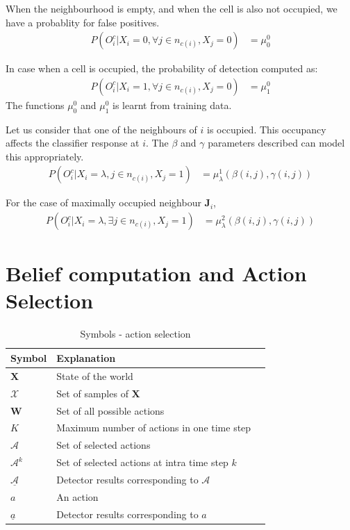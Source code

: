 \documentclass[10pt,twocolumn,letterpaper]{article}
\begin{document}
When the neighbourhood is empty, and when the cell is also not occupied, we have a probablity for false positives.
\begin{align}
 P(O^{c}_{i} |X_{i}=0 ,\forall j \in{n_{c(i)}},X_{j} =0)  &=\mu^{0}_{0}
\end{align}

In case when a cell is occupied, the probability of detection computed as:
\begin{align}
 P(O^{c}_{i} |X_{i}=1 ,\forall j \in{n_{c(i)}},X_{j} =0)  &=\mu^{0}_{1}
\end{align}
The functions $ \mu^{0}_{0} $  and $ \mu^{0}_{1} $ is learnt from training data.

Let us consider that one of the neighbours of $ i$ is occupied. This occupancy affects the classifier response at $ i$. The $\beta$ and $\gamma$ parameters described can model this appropriately.
 \begin{align}
 P(O^{c}_{i} |X_{i}=\lambda , j \in{n_{c(i)}},X_{j} =1)  &=\mu^{1}_{\lambda}(\beta(i,j),\gamma(i,j))
\end{align}


For the case of maximally occupied neighbour $ \textbf{J}_{i} $, 
\begin{align}
 P(O^{c}_{i} |X_{i}=\lambda ,\exists j  \in{n_{c(i)}},X_{j} =1)  &=\mu^{2}_{\lambda}(\beta(i,j),\gamma(i,j))
\end{align}

\section{Belief computation and Action Selection}

\begin{table}[ht]
  \begin{tabular}{lll}
   \hline
   Symbol & Explanation \\
   \hline
$\textbf{X} $ & State of the world\\
 $\mathcal{X} $ & Set of samples of $\textbf{X}$ \\
 $\textbf{W} $ & Set of all possible actions\\
 $K$ & Maximum number of actions in one time step\\
 $\mathcal{A} $ & Set of selected actions\\
 $\mathcal{A}^{k} $ & Set of selected actions at intra time step $k$\\
 $\underline{\mathcal{A}} $ & Detector results corresponding to $\mathcal{A}$\\
 $a $ & An action\\
 $ \underline{a} $ & Detector results corresponding to $ a$\\
   \hline
  \end{tabular}
  \caption{
    Symbols - action selection
  }
  \label{tab:Symbols in action selection}
\end{table}
\end{document}
